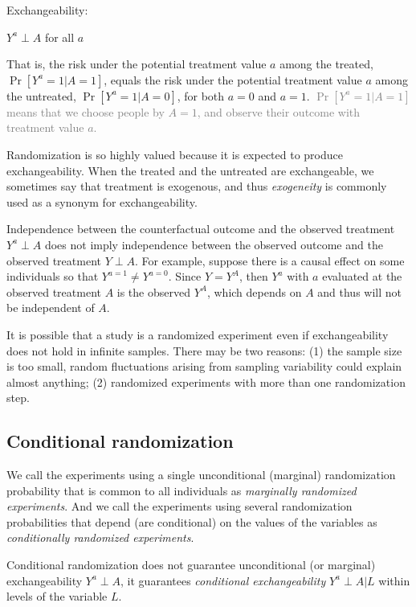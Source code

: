 \documentclass{article}
\begin{document}
\begin{mdframed}
Exchangeability:
\begin{center}
	$Y^{a} \perp A$ for all $a$
\end{center}
\end{mdframed}

That is, the risk under the potential treatment value $a$ among the treated, $\operatorname{Pr}\left[Y^{a}=1 | A=1\right]$, equals the risk under the potential treatment value $a$ among the untreated, $\operatorname{Pr}\left[Y^{a}=1 | A=0\right]$, for both $a=0$ and $a=1$. \textcolor{gray}{$\operatorname{Pr}\left[Y^{a}=1 | A=1\right]$ means that we choose people by $A=1$, and observe their outcome with treatment value $a$.}

Randomization is so highly valued because it is expected to produce exchangeability. When the treated and the untreated are exchangeable, we sometimes say that treatment is exogenous, and thus \textit{exogeneity} is commonly used as a synonym for exchangeability.

Independence between the counterfactual outcome and the observed treatment $Y^{a} \perp A$ does not imply independence between the observed outcome and the observed treatment $Y \perp A$. For example, suppose there is a causal effect on some individuals so that $Y^{a=1} \neq Y^{a=0}$. Since $Y=Y^{A}$, then $Y^{a}$ with $a$ evaluated at the observed treatment $A$ is the observed $Y^{A}$, which depends on $A$ and thus will not be independent of $A$.

It is possible that a study is a randomized experiment even if exchangeability does not hold in
infinite samples. There may be two reasons: (1) the sample size is too small, random fluctuations arising from sampling variability could explain almost anything; (2) randomized experiments with more than one randomization step.

\subsection{Conditional randomization}
We call the experiments using a single unconditional (marginal) randomization probability that is common to all individuals as \textit{marginally randomized experiments}. And we call the experiments using several randomization probabilities that depend (are conditional) on the values of the variables as \textit{conditionally randomized experiments}.

Conditional randomization does not guarantee unconditional (or marginal) exchangeability $Y^{a} \perp A$, it guarantees \textit{conditional exchangeability} $Y^{a} \perp A | L$ within levels of the variable $L$.
\end{document}
